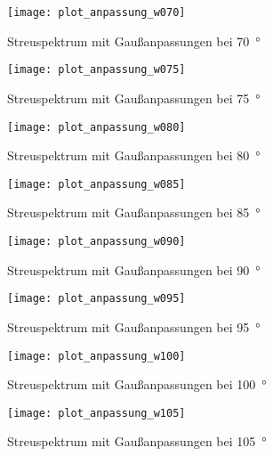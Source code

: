 \documentclass[11pt, ngerman, fleqn, DIV=15, headinclude, BCOR=2cm]{scrreprt}
\begin{document}
\begin{appendix}
\begin{figure}[h]
    \centering
    \texttt{[image: plot\_anpassung\_w070]}
    \caption{%
	    Streuspektrum mit Gaußanpassungen bei \SI{70}{\degree}
    }
    \label{fig:plot_anpassung_w070}
\end{figure}

\begin{figure}[h]
    \centering
    \texttt{[image: plot\_anpassung\_w075]}
    \caption{%
	    Streuspektrum mit Gaußanpassungen bei \SI{75}{\degree}
    }
    \label{fig:plot_anpassung_w075}
\end{figure}

\begin{figure}[h]
    \centering
    \texttt{[image: plot\_anpassung\_w080]}
    \caption{%
	    Streuspektrum mit Gaußanpassungen bei \SI{80}{\degree}
    }
    \label{fig:plot_anpassung_w080}
\end{figure}

\begin{figure}[h]
    \centering
    \texttt{[image: plot\_anpassung\_w085]}
    \caption{%
	    Streuspektrum mit Gaußanpassungen bei \SI{85}{\degree}
    }
    \label{fig:plot_anpassung_w085}
\end{figure}

\begin{figure}[h]
    \centering
    \texttt{[image: plot\_anpassung\_w090]}
    \caption{%
	    Streuspektrum mit Gaußanpassungen bei \SI{90}{\degree}
    }
    \label{fig:plot_anpassung_w090}
\end{figure}

\begin{figure}[h]
    \centering
    \texttt{[image: plot\_anpassung\_w095]}
    \caption{%
	    Streuspektrum mit Gaußanpassungen bei \SI{95}{\degree}
    }
    \label{fig:plot_anpassung_w095}
\end{figure}

\begin{figure}[h]
    \centering
    \texttt{[image: plot\_anpassung\_w100]}
    \caption{%
	    Streuspektrum mit Gaußanpassungen bei \SI{100}{\degree}
    }
    \label{fig:plot_anpassung_w100}
\end{figure}

\begin{figure}[h]
    \centering
    \texttt{[image: plot\_anpassung\_w105]}
    \caption{%
	    Streuspektrum mit Gaußanpassungen bei \SI{105}{\degree}
    }
    \label{fig:plot_anpassung_w105}
\end{figure}


\end{appendix}
\end{document}
